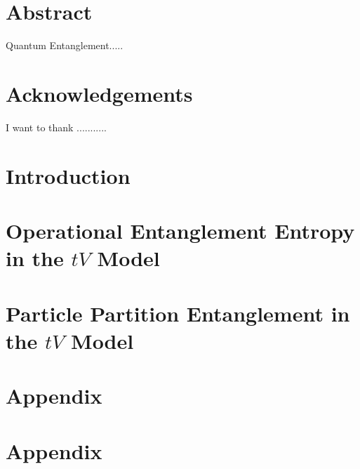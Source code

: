 \documentclass[12pt, two sided]{report}
\begin{document}




\chapter*{Abstract}
Quantum Entanglement.....

\chapter*{Acknowledgements}
I want to thank ...........

\tableofcontents

\chapter{Introduction}


\chapter{Operational Entanglement Entropy in the $tV$ Model}


\chapter{Particle Partition Entanglement in the $tV$ Model}



\appendix
\chapter{Appendix}


\chapter{Appendix}


{} 

\end{document}
